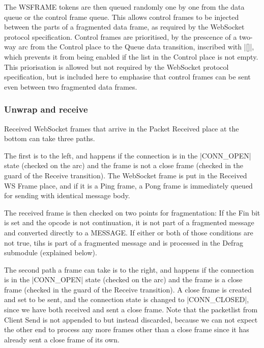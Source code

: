 			The WSFRAME tokens are then queued randomly one by one from the data queue or
			the control frame queue. This allows control frames to be injected between
			the parts of a fragmented data frame, as required by the WebSocket protocol
			specification. Control frames are prioritised, by the prescence of a
			two-way arc from the Control place to the Queue data transition, inscribed
			with |[]|, which prevents it from being enabled if the list
			in the Control place is not empty. This priorisation is allowed but not
			required by the WebSocket protocol specification, but is included here to
			emphasise that control frames can be sent even between two fragmented data
			frames.
		
	\subsubsection{Unwrap and receive}
		
		
		Received WebSocket frames that arrive in the Packet Received place at the
		bottom can take three paths. 
		
		The first is to the left, and happens if the
		connection is in the |CONN_OPEN| state (checked on the arc) and the
		frame is not a close frame (checked in the guard of the Receive transition). The WebSocket
		frame is put in the Received WS Frame place, and if it is a Ping frame, a Pong
		frame is immediately queued for sending with identical message body. 
		
		The received frame is then checked on two points for fragmentation: If the Fin
		bit is set and the opcode is not continuation, it is not part of a fragmented
		message and converted directly to a MESSAGE. If either or both of those
		conditions are not true, tihs is part of a fragmented message and is processed
		in the Defrag submodule (explained below).
		
		The second path a frame can take is to the right, and happens if the
		connection is in the |CONN_OPEN| state (checked on the arc) and the
		frame is a close frame (checked in the guard of the Receive transition). A
		close frame is created and set to be sent, and the
		connection state is changed to |CONN_CLOSED|, since we have both
		received and sent a close frame. Note that the packetlist from Client Send is
		not appended to but instead discarded, because we can not expect the other
		end to process any more frames other than a close frame since it has already
		sent a close frame of its own.
		
